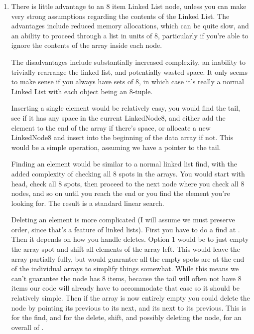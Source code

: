 \documentclass[12pt]{chmullighw}
\begin{document}
\begin{enumerate}

\item There is little advantage to an 8 item Linked List node, unless you can
make very strong assumptions regarding the contents of the Linked List. The
advantages include reduced memory allocations, which can be quite slow, and
an ability to proceed through a list in units of 8, particularly if you're able
to ignore the contents of the array inside each node.

The disadvantages include substantially increased complexity, an inability to
trivially rearrange the linked list, and potentially wasted space. It only seems
to make sense if you always have sets of 8, in which case it's really a normal
Linked List with each object being an 8-tuple.

Inserting a single element would be relatively easy, you would find the tail,
see if it has any space in the current LinkedNode8, and either add the element
to the end of the array if there's space, or allocate a new LinkedNode8 and 
insert into the beginning of the data array if not. This would be a simple 
operation, assuming we have a pointer to the tail.

Finding an element would be similar to a normal linked list find, with the added
complexity of checking all 8 spots in the arrays. You would start with head, check
all 8 spots, then proceed to the next node where you check all 8 nodes, and so on
until you reach the end or you find the element you're looking for. The result is
a standard  linear search.

Deleting an element is more complicated (I will assume we must preserve order,
since that's a feature of linked lists). First you have to do a find at .
Then it depends on how you handle deletes. Option 1 would be to just empty the
array spot and shift all elements of the array left. This would leave the array
partially fully, but would guarantee all the empty spots are at the end of the
individual arrays to simplify things somewhat. While this means we can't guarantee
the node has 8 items, because the tail will often not have 8 items our code will
already have to accommodate that case so it should be relatively simple. Then if
the array is now entirely empty you could delete the node by pointing its previous 
to its next, and its next to its previous. This is  for the find, and
 for the delete, shift, and possibly deleting the node, for an overall of
.


\end{enumerate}
\end{document}
